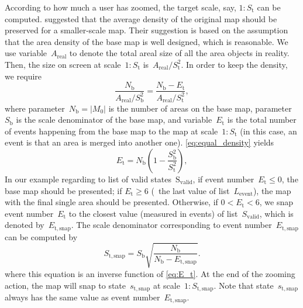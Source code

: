 \documentclass[]{interact}
\begin{document}
According to how much a user has zoomed,
the target scale, say, $1:S_\mathrm{t}$ can be computed.
\citet{Huang2016Webmap} suggested that 
the average density of the original map should be preserved 
for a smaller-scale map.
Their suggestion is based on the assumption that 
the area density of the base map is well designed, which is reasonable.
We use variable~$A_\mathrm{real}$ to denote the total areal size of 
all the area objects in reality.
Then, the size on screen at scale~$1:S_\mathrm{t}$ 
is~$A_\mathrm{real} \big/ S^2_\mathrm{t}$.
In order to keep the density, we require
\begin{equation}
\label{eq:equal_density}
\frac{N_\mathrm{b}}{A_\mathrm{real} \big/ S^2_\mathrm{b}} =
\frac{N_\mathrm{b}-E_\mathrm{t}}{A_\mathrm{real} \big/ S^2_\mathrm{t}},
\end{equation}
where parameter~$N_\mathrm{b} = |M_0|$ 
is the number of areas on the base map,
parameter~$S_\mathrm{b}$ is the scale denominator of the base map,
and variable~$E_\mathrm{t}$ is the total number of events 
happening from the base map to the map at scale~$1:S_\mathrm{t}$
(in this case, an event is that an area is merged into another one).
\eq\ref{eq:equal_density} yields
\begin{equation}
\label{eq:E_t}
E_\mathrm{t} = N_\mathrm{b} \left(1-\frac{S^2_\mathrm{b}}{S^2_\mathrm{t}}\right),
\end{equation}
In our example regarding to list of valid states~$\mathrm{S_\mathrm{valid}}$,
if event number~$E_\mathrm{t} \le 0$, the base map should be presented;
if $E_\mathrm{t} \ge 6$ (\ie~the last value of list~$L_\mathrm{event}$),
the map with the final single area should be presented.
Otherwise, if $0<E_\mathrm{t} < 6$, we snap event number~$E_\mathrm{t}$ 
to the closest value (measured in events) of list~$S_\mathrm{valid}$,
which is denoted by~$E_\mathrm{t,snap}$.
The scale denominator corresponding to event number~$E_\mathrm{t,snap}$
can be computed by 
\begin{equation}
\label{eq:S_t_snap}
S_\mathrm{t,snap} = S_\mathrm{b} \sqrt{\frac{N_\mathrm{b}}{N_\mathrm{b}-E_\mathrm{t,snap}}}.
\end{equation}
where this equation is an inverse function of \eq\ref{eq:E_t}.
At the end of the zooming action, 
the map will snap to state~$s_\mathrm{t,snap}$
at scale~$1:S_\mathrm{t,snap}$.
Note that state~$s_\mathrm{t,snap}$ always has 
the same value as event number~$E_\mathrm{t,snap}$.
\end{document}
